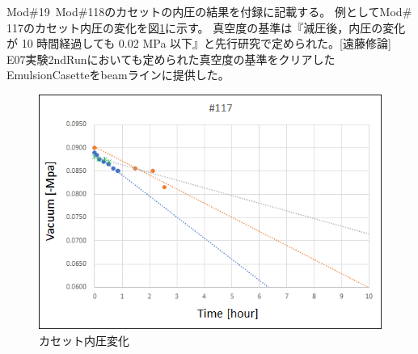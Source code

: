 \documentclass[12pt,a4paper]{jarticle}
\begin{document}
Mod$\#$19~Mod$\#$118のカセットの内圧の結果を付録に記載する。
例としてMod$\#$117のカセット内圧の変化を図\ref{fig:casette_bakyu-mu}に示す。
真空度の基準は『減圧後，内圧の変化が 10 時間経過しても 0.02 MPa 以下』と先行研究で定められた。[遠藤修論]
E07実験2ndRunにおいても定められた真空度の基準をクリアしたEmulsionCasetteをbeamラインに提供した。
\begin{figure}[htbp]
  \centering
     \includegraphics[width=140mm]{vacuum117.png}
  \caption{カセット内圧変化\label{fig:casette_bakyu-mu}}
\end{figure}
\end{document}
